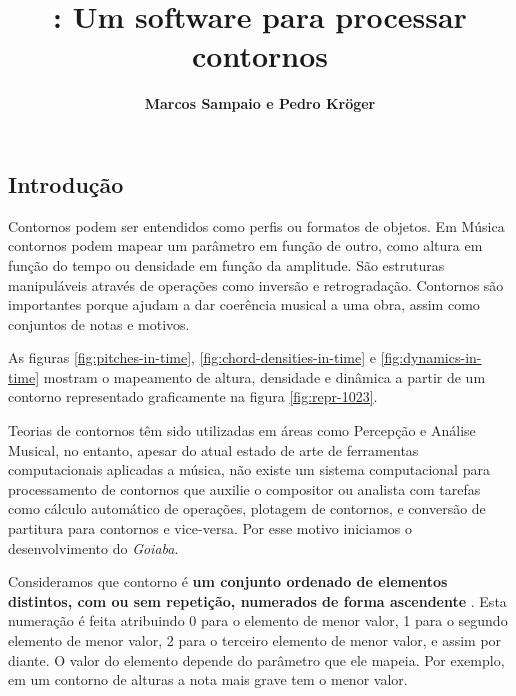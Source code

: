 \documentclass{sciposter}
\title{\goiaba{}: Um software para processar contornos}
\author{\textbf{Marcos Sampaio e Pedro Kröger}}
\institute{Genos---Grupo de pesquisa em computação musical}
\newcommand{\goiaba}[1]{\textit{Goiaba}}
\begin{document}



\maketitle

\begin{multicols}{3}

\section{Introdução}

Contornos podem ser entendidos como perfis ou formatos de objetos. Em
Música contornos podem mapear um parâmetro em função de outro, como
altura em função do tempo ou densidade em função da amplitude. São
estruturas manipuláveis através de operações como inversão e
retrogradação. Contornos são importantes porque ajudam a dar coerência
musical a uma obra, assim como conjuntos de notas e motivos.

As figuras \ref{fig:pitches-in-time},
\ref{fig:chord-densities-in-time} e \ref{fig:dynamics-in-time} mostram
o mapeamento de altura, densidade e dinâmica a partir de um contorno
representado graficamente na figura \ref{fig:repr-1023}.

Teorias de contornos
\cite{friedmann85:methodology,morris87:composition,morris93:directions,marvin.ea87:relating,clifford95:contour,polansky.ea92:possible,quinn97:fuzzy,beard03:contour}
têm sido utilizadas em áreas como Percepção e Análise Musical, no
entanto, apesar do atual estado de arte de ferramentas computacionais
aplicadas a música, não existe um sistema computacional para
processamento de contornos que auxilie o compositor ou analista com
tarefas como cálculo automático de operações, plotagem de contornos, e
conversão de partitura para contornos e vice-versa. Por esse motivo
iniciamos o desenvolvimento do \goiaba{}.

Consideramos que contorno é \textbf{um conjunto ordenado de elementos
  distintos, com ou sem repetição, numerados de forma ascendente}
\cite[p. 206]{morris93:directions}. Esta numeração é feita atribuindo
0 para o elemento de menor valor, 1 para o segundo elemento de menor
valor, 2 para o terceiro elemento de menor valor, e assim por
diante. O valor do elemento depende do parâmetro que ele mapeia. Por
exemplo, em um contorno de alturas a nota mais grave tem o menor
valor.


\end{multicols}
\end{document}
